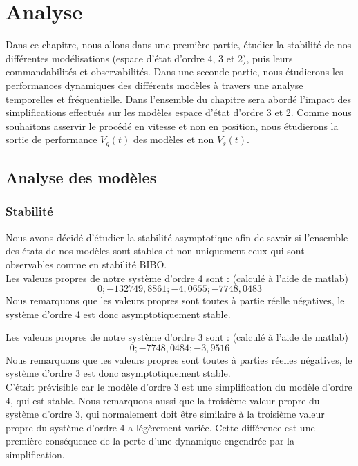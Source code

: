 \chapter{Analyse}
\label{chap:analyse}
Dans ce chapitre, nous allons dans une première partie, étudier la stabilité de nos différentes modélisations (espace d'état d'ordre 4, 3 et 2), puis leurs commandabilités et observabilités. Dans une seconde partie, nous étudierons les performances dynamiques des différents modèles à travers une analyse temporelles et fréquentielle. Dans l'ensemble du chapitre sera abordé l'impact des simplifications effectués sur les modèles espace d'état d'ordre 3 et 2.
Comme nous souhaitons asservir le procédé en vitesse et non en position, nous étudierons la sortie de performance $V_g(t)$ des modèles  et non $V_s(t)$. 

\section{Analyse des modèles}
\subsection{Stabilité}
Nous avons décidé d'étudier la stabilité asymptotique afin de savoir si l'ensemble des états de nos modèles sont stables et non uniquement ceux qui sont observables comme en stabilité BIBO. \\

\noindent Les valeurs propres de notre système d'ordre 4 sont : (calculé à l'aide de matlab)\\
\begin{equation}
{0 ; -132749,8861 ; -4,0655 ; -7748,0483 }
\end{equation}
Nous remarquons que les valeurs propres sont toutes à partie réelle négatives, le système d'ordre 4 est donc asymptotiquement stable.

\noindent Les valeurs propres de notre système d'ordre 3 sont : (calculé à l'aide de matlab)\\
\begin{equation}
{ 0 ; -7748,0484 ; -3,9516 }
\end{equation}
Nous remarquons que les valeurs propres sont toutes à parties réelles négatives, le système d'ordre 3 est donc asymptotiquement stable.\\

C'était prévisible car le modèle d'ordre 3 est une simplification du modèle d'ordre 4, qui est stable. Nous remarquons aussi que la troisième valeur propre du système d'ordre 3, qui normalement doit être similaire à la troisième valeur propre du système d'ordre 4 a légèrement variée. Cette différence est une première conséquence de la perte d'une dynamique engendrée par la simplification.

